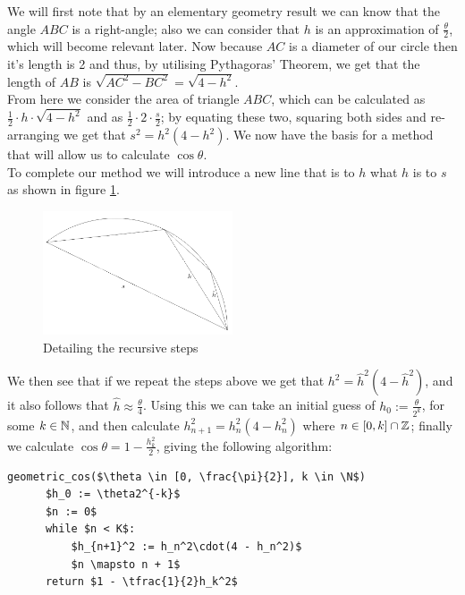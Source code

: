 We will first note that by an elementary geometry result we can know that the angle \(ABC\) is a right-angle; also we can consider that \(h\) is an approximation of \(\tfrac{\theta}{2}\), which will become relevant later. Now because \(AC\) is a diameter of our circle then it's length is 2 and thus, by utilising Pythagoras' Theorem, we get that the length of \(AB\) is \(\sqrt{AC^2 - BC^2} = \sqrt{4 - h^2}\).\\

From here we consider the area of triangle \(ABC\), which can be calculated as \(\frac{1}{2}\cdot h\cdot\sqrt{4-h^2}\) and as \(\frac{1}{2}\cdot2\cdot\frac{s}{2}\); by equating these two, squaring both sides and re-arranging we get that \(s^2 = h^2(4 - h^2)\). We now have the basis for a method that will allow us to calculate \(\cos\theta\).\\

To complete our method we will introduce a new line that is to \(h\) what \(h\) is to \(s\) as shown in figure \ref{FIG_"Geometric Trig 3"}.

\begin{figure}[!ht]
	\caption{Detailing the recursive steps}
	\label{FIG_"Geometric Trig 3"}
	\centering
	\includegraphics[width=0.5\textwidth]{"./Diagrams/Geometric Trig Diagram 3"}
\end{figure}

We then see that if we repeat the steps above we get that \(h^2 = \hat{h}^2(4 - \hat{h}^2)\), and it also follows that \(\hat{h} \approx \frac{\theta}{4}\). Using this we can take an initial guess of \(h_0 := \frac{\theta}{2^k}\), for some \(k \in \mathbb{N}\), and then calculate \(h_{n+1}^2 = h_n^2(4 - h_n^2)\) where \(n \in [0, k] \cap \mathbb{Z}\); finally we calculate \(\cos\theta = 1 - \frac{h_k^2}{2}\), giving the following algorithm:
  
\begin{lstlisting}[caption={Geometric calculation of \(\cos\)},label={PCD_"Geometric Cos"}]
  geometric_cos($\theta \in [0, \frac{\pi}{2}], k \in \N$)
      $h_0 := \theta2^{-k}$
      $n := 0$
      while $n < K$:
          $h_{n+1}^2 := h_n^2\cdot(4 - h_n^2)$
          $n \mapsto n + 1$
      return $1 - \tfrac{1}{2}h_k^2$
\end{lstlisting}\\

